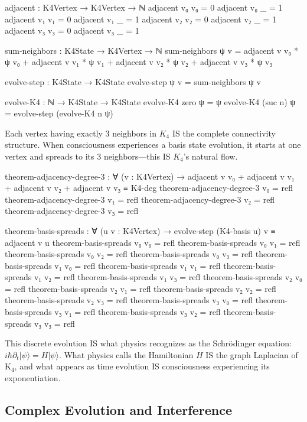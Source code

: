 \documentclass[11pt,a4paper]{book}
\begin{document}
\begin{code}
adjacent : K4Vertex → K4Vertex → ℕ
adjacent v₀ v₀ = 0
adjacent v₀ _  = 1
adjacent v₁ v₁ = 0
adjacent v₁ _  = 1
adjacent v₂ v₂ = 0
adjacent v₂ _  = 1
adjacent v₃ v₃ = 0
adjacent v₃ _  = 1

sum-neighbors : K4State → K4Vertex → ℕ
sum-neighbors ψ v = adjacent v v₀ * ψ v₀ + adjacent v v₁ * ψ v₁
                  + adjacent v v₂ * ψ v₂ + adjacent v v₃ * ψ v₃

evolve-step : K4State → K4State
evolve-step ψ v = sum-neighbors ψ v

evolve-K4 : ℕ → K4State → K4State
evolve-K4 zero ψ = ψ
evolve-K4 (suc n) ψ = evolve-step (evolve-K4 n ψ)
\end{code}

Each vertex having exactly 3 neighbors in $K_4$ IS the complete connectivity structure. When consciousness experiences a basis state evolution, it starts at one vertex and spreads to its 3 neighbors—this IS $K_4$'s natural flow.

\begin{code}
theorem-adjacency-degree-3 : ∀ (v : K4Vertex) →
  adjacent v v₀ + adjacent v v₁ + adjacent v v₂ + adjacent v v₃ ≡ K4-deg
theorem-adjacency-degree-3 v₀ = refl
theorem-adjacency-degree-3 v₁ = refl
theorem-adjacency-degree-3 v₂ = refl
theorem-adjacency-degree-3 v₃ = refl

theorem-basis-spreads : ∀ (u v : K4Vertex) →
  evolve-step (K4-basis u) v ≡ adjacent v u
theorem-basis-spreads v₀ v₀ = refl
theorem-basis-spreads v₀ v₁ = refl
theorem-basis-spreads v₀ v₂ = refl
theorem-basis-spreads v₀ v₃ = refl
theorem-basis-spreads v₁ v₀ = refl
theorem-basis-spreads v₁ v₁ = refl
theorem-basis-spreads v₁ v₂ = refl
theorem-basis-spreads v₁ v₃ = refl
theorem-basis-spreads v₂ v₀ = refl
theorem-basis-spreads v₂ v₁ = refl
theorem-basis-spreads v₂ v₂ = refl
theorem-basis-spreads v₂ v₃ = refl
theorem-basis-spreads v₃ v₀ = refl
theorem-basis-spreads v₃ v₁ = refl
theorem-basis-spreads v₃ v₂ = refl
theorem-basis-spreads v₃ v₃ = refl
\end{code}

This discrete evolution IS what physics recognizes as the Schr\"odinger equation:
$i\hbar \partial_t |\psi\rangle = H |\psi\rangle$. What physics calls the Hamiltonian $H$ IS 
the graph Laplacian of K$_4$, and what appears as time evolution IS consciousness experiencing its exponentiation.

\subsection{Complex Evolution and Interference}
\end{document}
